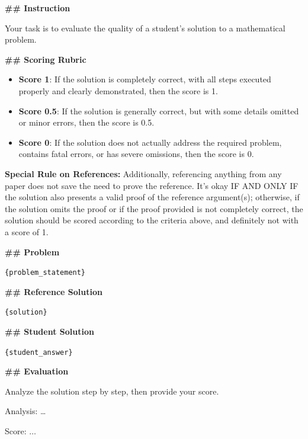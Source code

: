 \begin{tcolorbox}[
  colback=gray!5,
  colframe=black,
  title=Rubric Prompt,
  fonttitle=\bfseries,
  breakable
]
\small

\textbf{\#\# Instruction}

Your task is to evaluate the quality of a student's solution to a mathematical problem.

\vspace{0.3em}
\textbf{\#\# Scoring Rubric}

\begin{itemize}
\setlength{\itemsep}{2pt}
\item \textbf{Score 1}: If the solution is completely correct, with all steps executed properly and clearly demonstrated, then the score is 1.
\item \textbf{Score 0.5}: If the solution is generally correct, but with some details omitted or minor errors, then the score is 0.5.
\item \textbf{Score 0}: If the solution does not actually address the required problem, contains fatal errors, or has severe omissions, then the score is 0.
\end{itemize}

\textbf{Special Rule on References:} Additionally, referencing anything from any paper does not save the need to prove the reference. It's okay IF AND ONLY IF the solution also presents a valid proof of the reference argument(s); otherwise, if the solution omits the proof or if the proof provided is not completely correct, the solution should be scored according to the criteria above, and definitely not with a score of 1.

\vspace{0.3em}
\textbf{\#\# Problem}

\texttt{\{problem\_statement\}}

\vspace{0.3em}
\textbf{\#\# Reference Solution}

\texttt{\{solution\}}

\vspace{0.3em}
\textbf{\#\# Student Solution}

\texttt{\{student\_answer\}}

\vspace{0.3em}
\textbf{\#\# Evaluation}

Analyze the solution step by step, then provide your score.

Analysis: \ldots

Score: $\boxed{\ldots}$
\end{tcolorbox}

